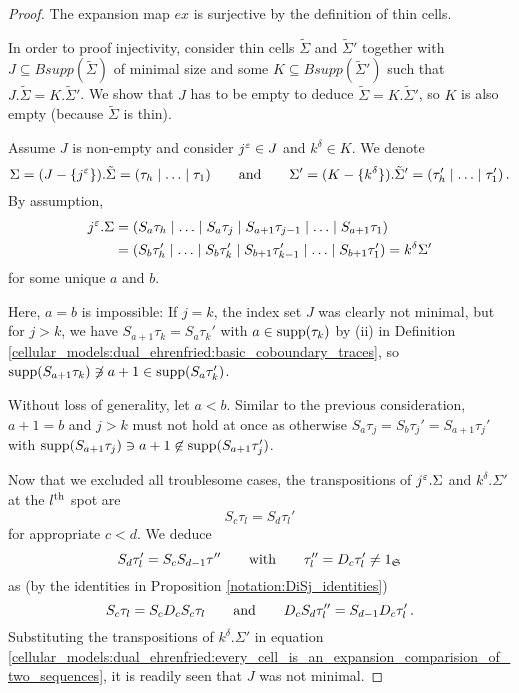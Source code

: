 \begin{proof}
    The expansion map $ex$ is surjective by the definition of thin cells.
    
    In order to proof injectivity, consider thin cells $\tilde\Sigma$ and $\tilde\Sigma'$ together with
    $J \subseteq Bsupp(\tilde\Sigma)$ of minimal size and some $K \subseteq Bsupp(\tilde\Sigma')$ such that
    $J.\tilde\Sigma = K.\tilde\Sigma'$.
    We show that $J$ has to be empty to deduce $\tilde\Sigma = K.\tilde\Sigma'$, so $K$ is also empty (because $\tilde\Sigma$ is thin).
    
    Assume $J$ is non-empty and consider $j^\eps \in J$ and $k^\delta \in K$.
    We denote
    \[
        \Sigma = (J - \{j^\eps\}).\tilde\Sigma = \inhom \mspc{and}{20} \Sigma' = (K - \{k^\delta\}).\tilde\Sigma' = \inhom[\tau'] \,.
    \]
    By assumption,
    \begin{align}
        j^\eps.\Sigma
            &= (S_a\tau_h \mid \ldots \mid S_a\tau_j \mid S_{a+1}\tau_{j-1} \mid \ldots \mid S_{a+1}\tau_1) \\
            \label{cellular_models:dual_ehrenfried:every_cell_is_an_expansion_comparision_of_two_sequences}
            &= (S_b\tau_h' \mid \ldots \mid S_b\tau_k' \mid S_{b+1}\tau_{k-1}' \mid \ldots \mid S_{b+1}\tau_1') = k^\delta\Sigma'
    \end{align}
    for some unique $a$ and $b$.
    
    Here, $a=b$ is impossible:
    If $j = k$, the index set $J$ was clearly not minimal,
    but for $j > k$, we have $S_{a+1}\tau_k = S_a\tau_k'$ with $a \in \supp(\tau_k)$ by (ii) in Definition \ref{cellular_models:dual_ehrenfried:basic_coboundary_traces},
    so $\supp(S_{a+1}\tau_k) \not\ni a+1 \in \supp(S_a\tau_k')$.
    
    Without loss of generality, let $a < b$.
    Similar to the previous consideration, $a+1 = b$ and $j > k$ must not hold at once as otherwise $S_a\tau_j = S_b\tau_j' = S_{a+1}\tau_j'$ with $\supp(S_{a+1}\tau_j) \ni a+1 \not\in \supp(S_{a+1}\tau_j')$.
    
    Now that we excluded all troublesome cases, the transpositions of $j^\eps.\Sigma$ and $k^\delta.\Sigma'$ at the $l\Th$ spot are
    \[
        S_c\tau_l = S_d\tau_l'
    \]
    for appropriate $c < d$.
    We deduce
    \[
        S_d\tau_l' = S_cS_{d-1}\tau'' \mspc{with}{20} \tau_l'' = D_c\tau_l' \neq 1_\SymGr
    \]
    as (by the identities in Proposition \ref{notation:DiSj_identities})
    \[
        S_c\tau_l = S_cD_cS_c\tau_l \mspc{and}{20} D_cS_d\tau_l'' = S_{d-1}D_c\tau_l' \,.
    \]
    Substituting the transpositions of $k^\delta.\Sigma'$ in equation \eqref{cellular_models:dual_ehrenfried:every_cell_is_an_expansion_comparision_of_two_sequences},
    it is readily seen that $J$ was not minimal.
\end{proof}
